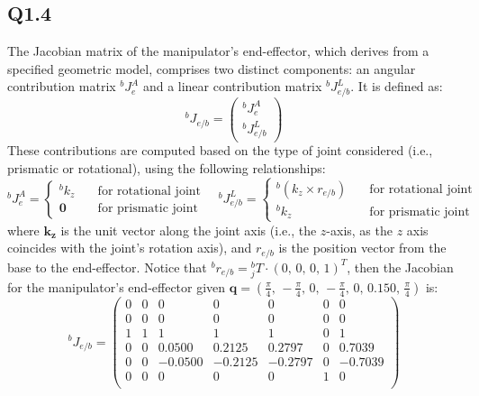 \subsection{Q1.4}
The Jacobian matrix of the manipulator’s end-effector, which derives from a specified geometric model, comprises two distinct components: an angular contribution matrix $^b J^A_{e}$ and a linear contribution matrix $^b J^L_{e/b}$.
It is defined as:
\begin{equation}
	\renewcommand{\arraystretch}{1.5}
	^b J_{e/b} = \begin{pmatrix}
		^b J^A_{e} \\ 
		^b J^L_{e/b}
	\end{pmatrix}
\end{equation}
	These contributions are computed based on the type of joint considered (i.e., prismatic or rotational), using the following relationships:
	\begin{equation}
		^bJ_{e}^A =
		\begin{cases}
			{}^b k_{z} \quad &\text{for rotational joint}\\
			\mathbf{0} \quad &\text{for prismatic joint}
		\end{cases} \quad
		{}^bJ_{e/b}^L =
		\begin{cases}
			{}^b (k_{z} \times r_{e/b})  \quad &\text{for rotational joint}\\
			{}^b k_{z} \quad &\text{for prismatic joint}
		\end{cases}
	\end{equation}
where $\mathbf{k_{z}}$ is the unit vector along the joint axis (i.e., the $z$-axis, as the $z$ axis coincides with the joint's rotation axis), and $r_{e/b}$ is the position vector from the base to the end-effector. Notice that ${}^b r_{e/b} = {}^b_j T \cdot (0,\,0,\,0,\,1)^T$, then the Jacobian for the manipulator’s end-effector given $\mathbf{q} = (\frac{\pi}{4},\,-\frac{\pi}{4},\,0,\,-\frac{\pi}{4},\,0,\,0.150,\,\frac{\pi}{4})$ is:
\begin{equation*} 
	^b J_{e/b} = \begin{pmatrix}
		0 & 0 & 0 & 0 & 0 & 0 & 0\\
		0 & 0 & 0 & 0 & 0 & 0 & 0\\
		1 & 1 & 1 & 1 & 1 & 0 & 1 \\ 
		0 & 0 & 0.0500 & 0.2125 & 0.2797 & 0 & 0.7039 \\
		0 & 0 & -0.0500 & -0.2125 & -0.2797 & 0 & -0.7039 \\
		0 & 0 & 0 & 0 & 0 & 1 & 0\\
	\end{pmatrix}
\end{equation*}

